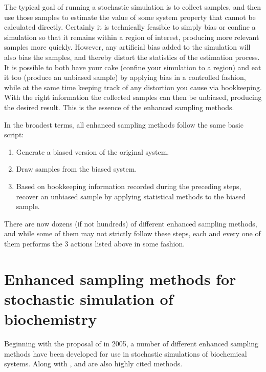 The typical goal of running a stochastic simulation is to collect samples, and then use those samples to estimate the value of some system property that cannot be calculated directly. Certainly it is technically feasible to simply bias or confine a simulation so that it remains within a region of interest, producing more relevant samples more quickly. However, any artificial bias added to the simulation will also bias the samples, and thereby distort the statistics of the estimation process. It is possible to both have your cake (confine your simulation to a region) and eat it too (produce an unbiased sample) by applying bias in a controlled fashion, while at the same time keeping track of any distortion you cause via bookkeeping. With the right information the collected samples can then be unbiased, producing the desired result. This is the essence of the enhanced sampling methods.

In the broadest terms, all enhanced sampling methods follow the same basic script:
\begin{enumerate}
    \item Generate a biased version of the original system.
    \item Draw samples from the biased system.
    \item Based on bookkeeping information recorded during the preceding steps, recover an unbiased sample by applying statistical methods to the biased sample. 
\end{enumerate}
There are now dozens (if not hundreds) of different enhanced sampling methods, and while some of them may not strictly follow these steps, each and every one of them performs the 3 actions listed above in some fashion.

\section{Enhanced sampling methods for stochastic simulation of biochemistry}

Beginning with the proposal of  in 2005\supercite{Allen:2005wy}, a number of different enhanced sampling methods have been developed for use in stochastic simulations of biochemical systems. Along with ,  and  are also highly cited methods.


